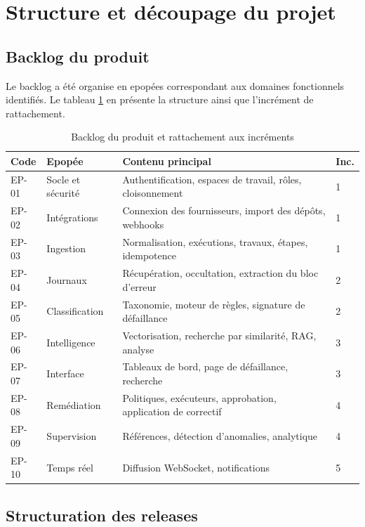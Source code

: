 \documentclass[12pt,a4paper,oneside]{report}
\begin{document}
\section{Structure et découpage du projet}

\subsection{Backlog du produit}

Le backlog a été organise en epopées correspondant aux domaines fonctionnels
identifiés. Le tableau \ref{tab:backlog} en présente la structure ainsi que
l'incrément de rattachement.

\begin{table}[htbp]
\centering
\caption{Backlog du produit et rattachement aux incréments}
\label{tab:backlog}
\small
\begin{tabularx}{\textwidth}{@{}llXl@{}}
\toprule
\textbf{Code} & \textbf{Epopée} & \textbf{Contenu principal} & \textbf{Inc.} \\
\midrule
EP-01 & Socle et sécurité & Authentification, espaces de travail, rôles, cloisonnement & 1 \\
EP-02 & Intégrations & Connexion des fournisseurs, import des dépôts, webhooks & 1 \\
EP-03 & Ingestion & Normalisation, exécutions, travaux, étapes, idempotence & 1 \\
EP-04 & Journaux & Récupération, occultation, extraction du bloc d'erreur & 2 \\
EP-05 & Classification & Taxonomie, moteur de règles, signature de défaillance & 2 \\
EP-06 & Intelligence & Vectorisation, recherche par similarité, RAG, analyse & 3 \\
EP-07 & Interface & Tableaux de bord, page de défaillance, recherche & 3 \\
EP-08 & Remédiation & Politiques, exécuteurs, approbation, application de correctif & 4 \\
EP-09 & Supervision & Références, détection d'anomalies, analytique & 4 \\
EP-10 & Temps réel & Diffusion WebSocket, notifications & 5 \\
\bottomrule
\end{tabularx}
\end{table}

\subsection{Structuration des releases}
\end{document}
